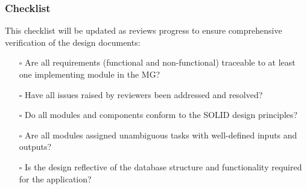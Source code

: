 \documentclass[12pt, titlepage]{article}
\begin{document}
\subsubsection{Checklist}
This checklist will be updated as reviews progress to ensure comprehensive verification of
the design documents:
\begin{itemize}
  \item[$\square$] Are all requirements (functional and non-functional) traceable to at least one
  implementing module in the MG?
  \item[$\square$] Have all issues raised by reviewers been addressed and resolved?
  \item[$\square$] Do all modules and components conform to the SOLID design principles?
  \item[$\square$] Are all modules assigned unambiguous tasks with well-defined inputs and outputs?
  \item[$\square$] Is the design reflective of the database structure and functionality required for
  the application?
\end{itemize}
\end{document}
